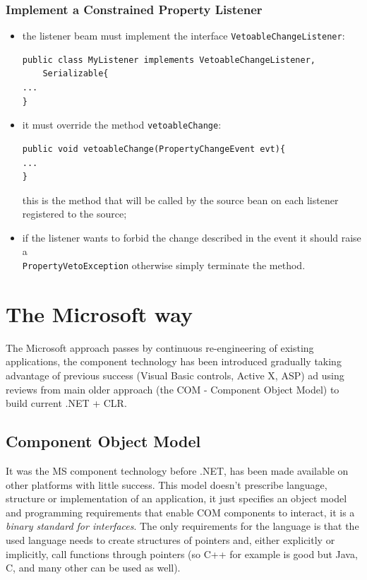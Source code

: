 \subsubsection{Implement a Constrained Property Listener}
\begin{itemize}
    \item the listener beam must implement the interface \verb|VetoableChangeListener|:
    \begin{verbatim}
public class MyListener implements VetoableChangeListener,
    Serializable{
...
}
    \end{verbatim}
    
    \item it must override the method \verb|vetoableChange|:
    \begin{verbatim}
public void vetoableChange(PropertyChangeEvent evt){
...
}
    \end{verbatim}
    this is the method that will be called by the source bean on each listener registered to the source;
    
    \item if the listener wants to forbid the change described in the event it should raise a \\
    \verb|PropertyVetoException| otherwise simply terminate the method.
\end{itemize}

\section{The Microsoft way}
The Microsoft approach passes by continuous re-engineering of existing applications, the component technology has been introduced gradually taking advantage of previous success (Visual Basic controls, Active X, ASP) ad using reviews from main older approach (the COM - Component Object Model) to build current .NET + CLR.

\subsection{Component Object Model}
It was the MS component technology before .NET, has been made available on other platforms with little success.
This model doesn't prescribe language, structure or implementation of an application, it just specifies an object model and programming requirements that enable COM components to interact, it is a \emph{binary standard for interfaces}.
The only requirements for the language is that the used language needs to create structures of pointers and, either explicitly or implicitly, call functions through pointers (so C++ for example is good but Java, C, and many other can be used as well).

